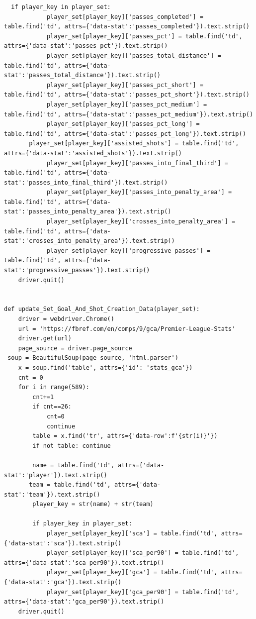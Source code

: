 \documentclass[12pt]{report}
\begin{document}
{\begin{lstlisting}
  if player_key in player_set:
            player_set[player_key]['passes_completed'] = table.find('td', attrs={'data-stat':'passes_completed'}).text.strip()
            player_set[player_key]['passes_pct'] = table.find('td', attrs={'data-stat':'passes_pct'}).text.strip()
            player_set[player_key]['passes_total_distance'] = table.find('td', attrs={'data-stat':'passes_total_distance'}).text.strip()
            player_set[player_key]['passes_pct_short'] = table.find('td', attrs={'data-stat':'passes_pct_short'}).text.strip()
            player_set[player_key]['passes_pct_medium'] = table.find('td', attrs={'data-stat':'passes_pct_medium'}).text.strip()
            player_set[player_key]['passes_pct_long'] = table.find('td', attrs={'data-stat':'passes_pct_long'}).text.strip()
       player_set[player_key]['assisted_shots'] = table.find('td', attrs={'data-stat':'assisted_shots'}).text.strip()
            player_set[player_key]['passes_into_final_third'] = table.find('td', attrs={'data-stat':'passes_into_final_third'}).text.strip()
            player_set[player_key]['passes_into_penalty_area'] = table.find('td', attrs={'data-stat':'passes_into_penalty_area'}).text.strip()
            player_set[player_key]['crosses_into_penalty_area'] = table.find('td', attrs={'data-stat':'crosses_into_penalty_area'}).text.strip()
            player_set[player_key]['progressive_passes'] = table.find('td', attrs={'data-stat':'progressive_passes'}).text.strip()
    driver.quit()


def update_Set_Goal_And_Shot_Creation_Data(player_set):
    driver = webdriver.Chrome()
    url = 'https://fbref.com/en/comps/9/gca/Premier-League-Stats'
    driver.get(url)
    page_source = driver.page_source
 soup = BeautifulSoup(page_source, 'html.parser')
    x = soup.find('table', attrs={'id': 'stats_gca'})
    cnt = 0
    for i in range(589):
        cnt+=1
        if cnt==26:
            cnt=0
            continue
        table = x.find('tr', attrs={'data-row':f'{str(i)}'})
        if not table: continue

        name = table.find('td', attrs={'data-stat':'player'}).text.strip()
       team = table.find('td', attrs={'data-stat':'team'}).text.strip()
        player_key = str(name) + str(team)

        if player_key in player_set:
            player_set[player_key]['sca'] = table.find('td', attrs={'data-stat':'sca'}).text.strip()
            player_set[player_key]['sca_per90'] = table.find('td', attrs={'data-stat':'sca_per90'}).text.strip()
            player_set[player_key]['gca'] = table.find('td', attrs={'data-stat':'gca'}).text.strip()
            player_set[player_key]['gca_per90'] = table.find('td', attrs={'data-stat':'gca_per90'}).text.strip()
    driver.quit()


\end{lstlisting}}
\end{document}
